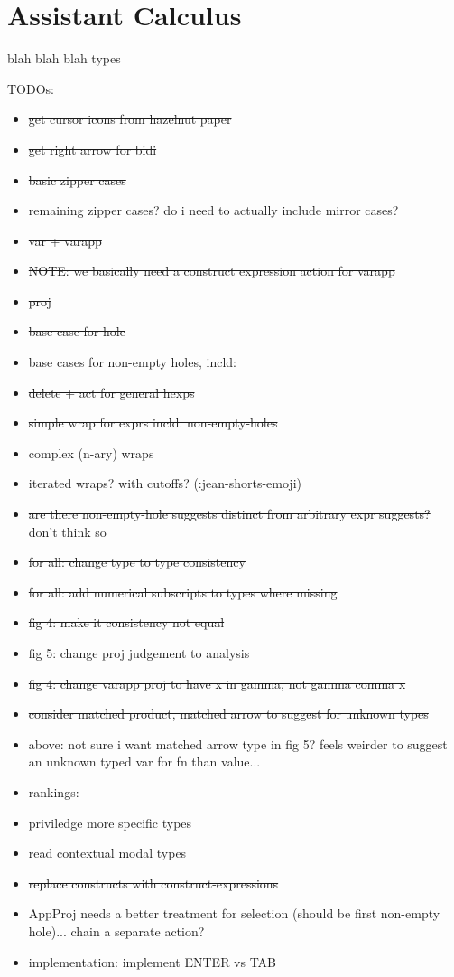 \section{Assistant Calculus}\label{sec:assistant-calculus}

blah blah blah types

TODOs:
\begin{itemize}
    \item \sout{get cursor icons from hazelnut paper}
    \item \sout{get right arrow for bidi}
    \item \sout{basic zipper cases}
    \item remaining zipper cases? do i need to actually include mirror cases?
    \item \sout{var + varapp}
    \item \sout{NOTE: we basically need a construct expression action for varapp}
    \item \sout{proj}
    \item \sout{base case for hole}
    \item \sout{base cases for non-empty holes, incld:}
    \item \sout{delete + act for general hexps}
    \item \sout{simple wrap for exprs incld. non-empty-holes}
    \item complex (n-ary) wraps
    \item iterated wraps? with cutoffs? (:jean-shorts-emoji)
    \item \sout{are there non-empty-hole suggests distinct from arbitrary expr suggests?} don't think so
    \item \sout{for all: change type to type consistency}
    \item \sout{for all: add numerical subscripts to types where missing}
    \item \sout{fig 4: make it consistency not equal}
    \item \sout{fig 5: change proj judgement to analysis}
    \item \sout{fig 4: change varapp proj to have x in gamma, not gamma comma x}
    \item \sout{consider matched product, matched arrow to suggest for unknown types}
    \item above: not sure i want matched arrow type in fig 5? feels weirder to suggest an unknown typed var for fn than value...
    \item rankings:
    \item priviledge more specific types
    \item read contextual modal types
    \item \sout{replace constructs with construct-expressions}
    \item AppProj needs a better treatment for selection (should be first non-empty hole)... chain a separate action?
    \item implementation: implement ENTER vs TAB
\end{itemize}

